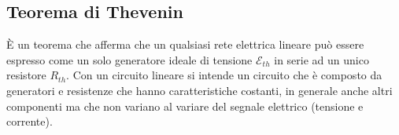 \documentclass[a4paper, oneside]{article}
\newcommand{\E}{\mathcal{E}}
\begin{document}
\subsection{Teorema di Thevenin}
È un teorema che afferma che un qualsiasi rete elettrica lineare può essere espresso come un solo generatore ideale di tensione $\E_{th}$ 
in serie ad un unico resistore $R_{th}$. Con un circuito lineare si intende un circuito che è composto da generatori e resistenze che hanno 
caratteristiche costanti, in generale anche altri componenti ma che non variano al variare del segnale elettrico (tensione e corrente).
\begin{center}
\end{center}
\newpage
\end{document}
